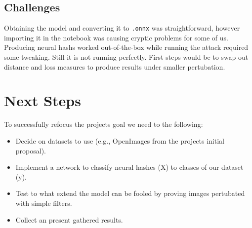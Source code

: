 \documentclass[a4paper]{scrartcl}
\begin{document}
\subsection{Challenges}

Obtaining the model and converting it to \texttt{.onnx} was straightforward, however importing it in the notebook was causing cryptic problems for some of us. Producing neural hashs worked out-of-the-box while running the attack required some tweaking. Still it is not running perfectly. First steps would be to swap out distance and loss measures to produce results under smaller pertubation. 

\section{Next Steps}

To successfully refocus the projects goal we need to the following:
\begin{itemize}
	\item Decide on datasets to use (e.g., OpenImages from the projects initial proposal).
	\item Implement a network to classify neural hashes (X) to classes of our dataset (y).
	\item Test to what extend the model can be fooled by proving images pertubated with simple filters.
	\item Collect an present gathered results.
\end{itemize}
\end{document}
